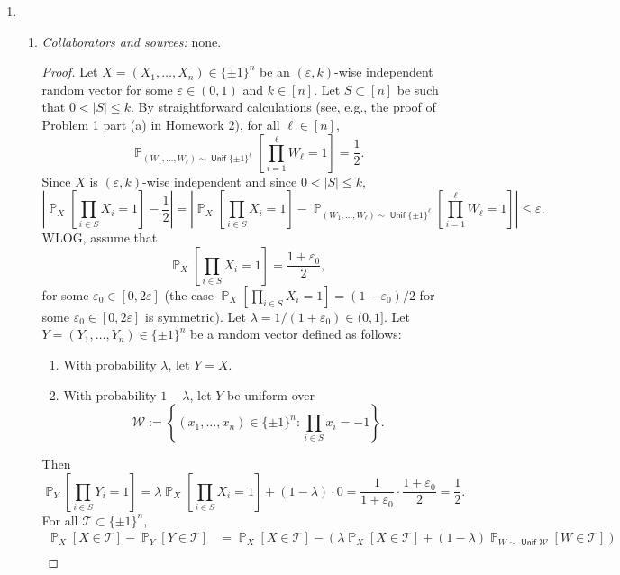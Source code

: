 \documentclass[letterpaper, reqno,11pt]{article}
\newcommand{\PP}{\mathop{{}\mathbb{P}}}
\DeclareMathOperator{\Unif}{\mathsf{Unif}}
\begin{document}
\begin{enumerate}
  \clearpage

  \item \begin{enumerate}
    \item \noindent\emph{Collaborators and sources:} none.
    
    \begin{proof}
      Let $X = (X_1, \ldots, X_n) \in \{ \pm 1 \}^n$ be an $(\varepsilon, k)$-wise independent random vector for some $\varepsilon \in (0, 1)$ and $k \in [n]$. Let $S \subset [n]$ be such that $0 < |S| \leq k$. By straightforward calculations (see, e.g., the proof of Problem 1 part (a) in Homework 2), for all $\ell \in [n]$,
      $$ \PP_{\left(W_1, \ldots, W_\ell\right) \sim \Unif\{ \pm 1 \}^\ell}\left[\prod_{i = 1}^\ell W_\ell = 1\right] = \frac{1}{2}. $$
      Since $X$ is $(\varepsilon, k)$-wise independent and since $0 < |S| \leq k$,
      $$ \left|\PP_X\left[\prod_{i \in S} X_i = 1\right] - \frac{1}{2}\right| = \left|\PP_X\left[\prod_{i \in S} X_i = 1\right] - \PP_{\left(W_1, \ldots, W_\ell\right) \sim \Unif\{ \pm 1 \}^\ell}\left[\prod_{i = 1}^\ell W_\ell = 1\right]\right| \leq \varepsilon. $$
      WLOG, assume that
      $$ \PP_X\left[\prod_{i \in S} X_i = 1\right] = \frac{1 + \varepsilon_0}{2}, $$
      for some $\varepsilon_0 \in [0, 2\varepsilon]$ (the case $\PP_X[\prod_{i \in S} X_i = 1] = (1 - \varepsilon_0)/2$ for some $\varepsilon_0 \in [0, 2\varepsilon]$ is symmetric). Let $\lambda = 1/(1 + \varepsilon_0) \in (0, 1]$. Let $Y = (Y_1, \ldots, Y_n) \in \{ \pm 1 \}^n$ be a random vector defined as follows:
      \begin{enumerate}[label=(\roman*), itemsep=0pt]
        \item With probability $\lambda$, let $Y = X$.
        \item With probability $1 - \lambda$, let $Y$ be uniform over
        $$ \mathcal W := \left\{ \left(x_1, \ldots, x_n\right) \in \{ \pm 1 \}^n : \prod_{i \in S} x_i = -1 \right\}. $$
      \end{enumerate}
      Then
      $$ \PP_Y\left[\prod_{i \in S} Y_i = 1\right] = \lambda \PP_X\left[\prod_{i \in S} X_i = 1\right] + (1 - \lambda) \cdot 0 = \frac{1}{1 + \varepsilon_0} \cdot \frac{1 + \varepsilon_0}{2} = \frac{1}{2}. $$
      For all $\mathcal T \subset \{ \pm 1 \}^n$,
      \begin{align*}
        \PP_X[X \in \mathcal T] - \PP_Y[Y \in \mathcal T] &= \PP_X[X \in \mathcal T] - \left(\lambda \PP_X[X \in \mathcal T] + (1 - \lambda) \PP_{W \sim \Unif \mathcal W}[W \in \mathcal T]\right) \\

\end{align*}
\end{proof}
\end{enumerate}
\end{enumerate}
\end{document}
